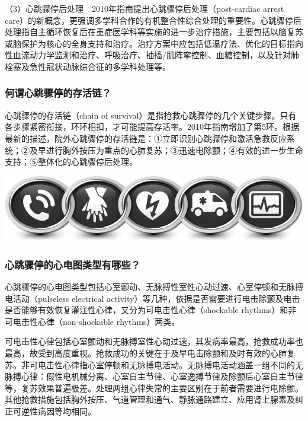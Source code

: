 （3）心跳骤停后处理　2010年指南提出心跳骤停后处理（post-cardiac arrest
care）的新概念，更强调多学科合作的有机整合性综合处理的重要性。心跳骤停后处理指自主循环恢复后在重症医学科等实施的进一步治疗措施，主要包括以脑复苏或脑保护为核心的全身支持和治疗。治疗方案中应包括低温疗法、优化的目标指向性血流动力学监测和治疗、呼吸治疗、抽搐/肌阵挛控制、血糖控制，以及针对肺栓塞及急性冠状动脉综合征的多学科处理等。

\subsubsection{何谓心跳骤停的存活链？}

心跳骤停的存活链（chain of
survival）是指抢救心跳骤停的几个关键步骤。只有各步骤紧密衔接，环环相扣，才可能提高存活率。2010年指南增加了第5环。根据最新的描述，院外心跳骤停的存活链是：①立即识别心跳骤停和激活急救反应系统；②及早进行胸外按压为重点的心肺复苏；③迅速电除颤；④有效的进一步生命支持；⑤整体化的心跳骤停后处理。

\begin{center}
\includegraphics{./images/Image00136.jpg}
\end{center}

\subsubsection{心跳骤停的心电图类型有哪些？}

心跳骤停的心电图类型包括心室颤动、无脉搏性室性心动过速、心室停顿和无脉搏电活动（pulseless
electrical
activity）等几种，依据是否需要进行电击除颤及电击是否能够有效恢复灌注性心律，又分为可电击性心律（shockable
rhythms）和非可电击性心律（non-shockable rhythms）两类。

可电击性心律包括心室颤动和无脉搏室性心动过速，其发病率最高，抢救成功率也最高，故受到高度重视。抢救成功的关键在于及早电击除颤和及时有效的心肺复苏。非可电击性心律指心室停顿和无脉搏电活动。无脉搏电活动涵盖一组不同的无脉搏心律：假性电机械分离、心室自主节律、心室逸搏节律及除颤后心室自主节律等，复苏效果普遍极差。处理两组心律失常的主要区别在于前者需要进行电除颤。其他抢救措施包括胸外按压、气道管理和通气、静脉通路建立、应用肾上腺素及纠正可逆性病因等均相同。

